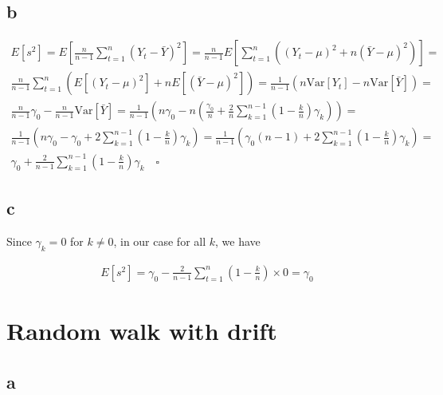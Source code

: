 \documentclass[]{book}
\begin{document}
\subsection*{b}\label{b-12}

\begin{gather*}
  E[s^2] = E\left[\frac{n}{n-1} \sum_{t=1}^n (Y_t - \bar{Y})^2 \right] =
    \frac{n}{n-1} E\left[\sum_{t=1}^n \left( (Y_t-\mu)^2  + n(\bar{Y} - \mu)^2 \right)\right] = \\
  \frac{n}{n-1} \sum_{t=1}^n \left( E[(Y_t-\mu)^2]  + nE[(\bar{Y} - \mu)^2] \right) = 
    \frac{1}{n-1} \left( n\text{Var}[Y_t] - n\text{Var}[\bar{Y}] \right) = \\
  \frac{n}{n-1} \gamma_0 - \frac{n}{n-1} \text{Var}[\bar{Y}] =
    \frac{1}{n-1} \left( n \gamma_0 - n \left( \frac{\gamma_0}{n} + \frac{2}{n} \sum_{k=1}^{n-1} \left( 1 - \frac{k}{n} \right) \gamma_k\right) \right) = \\
  \frac{1}{n-1} \left( n \gamma_0 - \gamma_0 + 2 \sum_{k=1}^{n-1} \left( 1 - \frac{k}{n} \right) \gamma_k\right) = 
    \frac{1}{n-1} \left( \gamma_0(n-1) + 2 \sum_{k=1}^{n-1} \left( 1 - \frac{k}{n} \right) \gamma_k\right) = \\
  \gamma_0 + \frac{2}{n-1} \sum_{k=1}^{n-1} \left( 1 - \frac{k}{n} \right) \gamma_k \quad \square
\end{gather*}

\subsection*{c}\label{c-6}

Since \(\gamma_k = 0\) for \(k \neq 0\), in our case for all \(k\), we
have

\begin{gather*}
  E[s^2] = \gamma_0 - \frac{2}{n-1} \sum_{t=1}^n \left( 1 - \frac{k}{n} \right) \times 0 = \gamma_0
\end{gather*}

\section{Random walk with drift}\label{random-walk-with-drift}

\subsection*{a}\label{a-13}
\end{document}
